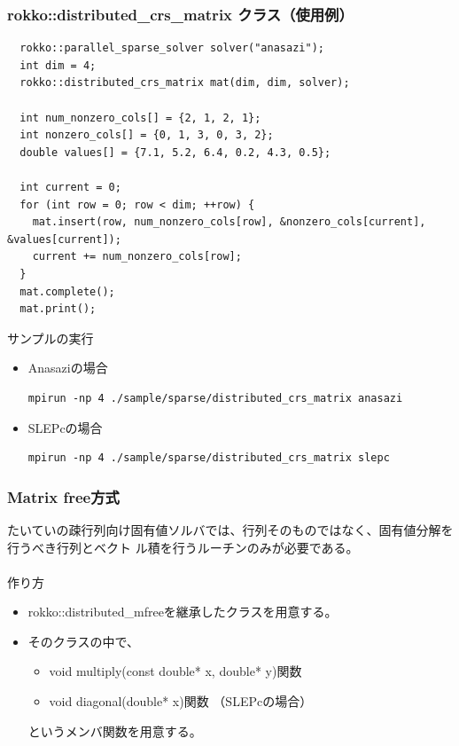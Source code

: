 \begin{frame}[c,fragile]
  \frametitle{rokko::distributed\_crs\_matrix クラス（使用例）
     }
\begin{lstlisting}
  rokko::parallel_sparse_solver solver("anasazi");
  int dim = 4;
  rokko::distributed_crs_matrix mat(dim, dim, solver);

  int num_nonzero_cols[] = {2, 1, 2, 1};
  int nonzero_cols[] = {0, 1, 3, 0, 3, 2};
  double values[] = {7.1, 5.2, 6.4, 0.2, 4.3, 0.5};

  int current = 0;
  for (int row = 0; row < dim; ++row) {
    mat.insert(row, num_nonzero_cols[row], &nonzero_cols[current], &values[current]);
    current += num_nonzero_cols[row]; 
  }
  mat.complete();
  mat.print();
\end{lstlisting}
\noindent
サンプルの実行
  \begin{itemize}
  \item Anasaziの場合
\begin{lstlisting}[style=shstyle]
mpirun -np 4 ./sample/sparse/distributed_crs_matrix anasazi
\end{lstlisting}
  \item SLEPcの場合
\begin{lstlisting}[style=shstyle]
mpirun -np 4 ./sample/sparse/distributed_crs_matrix slepc
\end{lstlisting}
  \end{itemize}
\end{frame}


\begin{frame}[c,fragile]
  \frametitle{Matrix free方式}
たいていの疎行列向け固有値ソルバでは、行列そのものではなく、固有値分解を行うべき行列とベクト
ル積を行うルーチンのみが必要である。
　\\
　\\
\noindent
作り方
  \begin{itemize}
  \item rokko::distributed\_mfreeを継承したクラスを用意する。
  \item そのクラスの中で、
     \begin{itemize}
     \item void multiply(const double* x, double* y)関数
     \item void diagonal(double* x)関数 （SLEPcの場合） 
     \end{itemize}
というメンバ関数を用意する。
  \end{itemize}
\end{frame}

